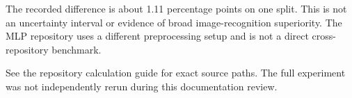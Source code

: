 \documentclass[11pt]{article}
\begin{document}
The recorded difference is about 1.11 percentage points on one split. This is not an uncertainty interval or evidence of broad image-recognition superiority. The MLP repository uses a different preprocessing setup and is not a direct cross-repository benchmark.

See the repository calculation guide for exact source paths. The full experiment was not independently rerun during this documentation review.
\end{document}
